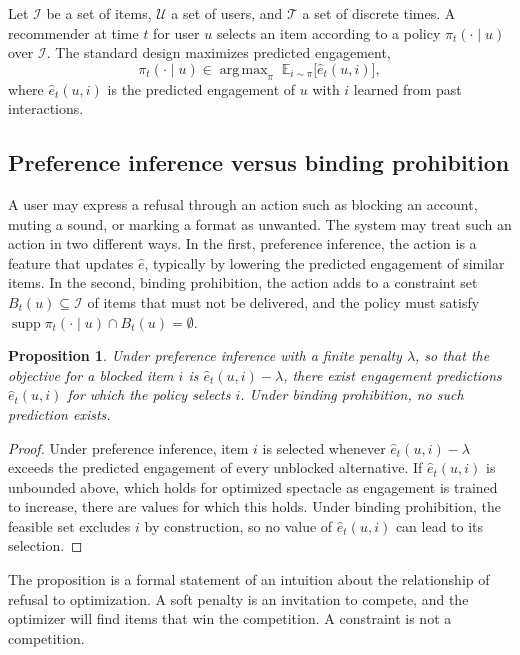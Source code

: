 \documentclass[12pt]{article}
\theoremstyle{plain}
\newtheorem{proposition}{Proposition}
\theoremstyle{definition}
\theoremstyle{remark}
\DeclareMathOperator*{\argmax}{arg\,max}
\newcommand{\E}{\mathbb{E}}
\begin{document}
Let $\mathcal{I}$ be a set of items, $\mathcal{U}$ a set of users, and $\mathcal{T}$ a set of discrete times. A recommender at time $t$ for user $u$ selects an item according to a policy $\pi_t(\cdot \mid u)$ over $\mathcal{I}$. The standard design maximizes predicted engagement,
\[
\pi_t(\cdot \mid u) \in \argmax_{\pi} \; \E_{i \sim \pi}\bigl[\hat e_t(u, i)\bigr],
\]
where $\hat e_t(u,i)$ is the predicted engagement of $u$ with $i$ learned from past interactions.

\subsection*{Preference inference versus binding prohibition}

A user may express a refusal through an action such as blocking an account, muting a sound, or marking a format as unwanted. The system may treat such an action in two different ways. In the first, preference inference, the action is a feature that updates $\hat e$, typically by lowering the predicted engagement of similar items. In the second, binding prohibition, the action adds to a constraint set $B_t(u) \subseteq \mathcal{I}$ of items that must not be delivered, and the policy must satisfy $\operatorname{supp}\pi_t(\cdot \mid u) \cap B_t(u) = \emptyset$.

\begin{proposition}\label{prop:D1}
Under preference inference with a finite penalty $\lambda$, so that the objective for a blocked item $i$ is $\hat e_t(u,i) - \lambda$, there exist engagement predictions $\hat e_t(u,i)$ for which the policy selects $i$. Under binding prohibition, no such prediction exists.
\end{proposition}

\begin{proof}
Under preference inference, item $i$ is selected whenever $\hat e_t(u,i) - \lambda$ exceeds the predicted engagement of every unblocked alternative. If $\hat e_t(u,i)$ is unbounded above, which holds for optimized spectacle as engagement is trained to increase, there are values for which this holds. Under binding prohibition, the feasible set excludes $i$ by construction, so no value of $\hat e_t(u,i)$ can lead to its selection.
\end{proof}

The proposition is a formal statement of an intuition about the relationship of refusal to optimization. A soft penalty is an invitation to compete, and the optimizer will find items that win the competition. A constraint is not a competition.
\end{document}
